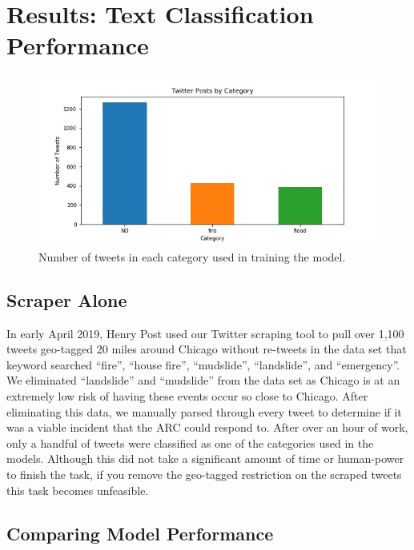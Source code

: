 \documentclass[titlepage, 12pt]{article}
\begin{document}
\section{Results: Text Classification Performance}
\begin{figure}[h!]
\centering
\includegraphics[scale=0.8]{pics/tw_po_by_cat.jpg}
\caption{Number of tweets in each category used in training the model.}
\label{fig:classified_tweet_count}
\end{figure}

\subsection{Scraper Alone}
\hspace{0.5 cm}In early April 2019, Henry Post used our Twitter scraping tool to pull over 1,100 tweets geo-tagged 20 miles around Chicago without re-tweets in the data set that keyword searched ``fire'', ``house fire'', ``mudslide'', ``landslide'', and ``emergency''. We eliminated ``landslide'' and ``mudslide'' from the data set as Chicago is at an extremely low risk of having these events occur so close to Chicago. After eliminating this data, we manually parsed through every tweet to determine if it was a viable incident that the ARC could respond to. After over an hour of work, only a handful of tweets were classified as one of the categories used in the models. Although this did not take a significant amount of time or human-power to finish the task, if you remove the geo-tagged restriction on the scraped tweets this task becomes unfeasible.
\subsection{Comparing Model Performance}
\end{document}
